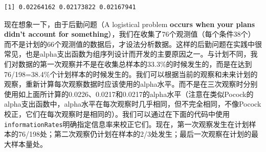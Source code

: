 \documentclass[
  letterpaper,
  DIV=11,
  numbers=noendperiod]{scrreprt}
\newenvironment{Shaded}{\begin{snugshade}}{\end{snugshade}}
\newcommand{\AttributeTok}[1]{\textcolor[rgb]{0.40,0.45,0.13}{#1}}
\newcommand{\DecValTok}[1]{\textcolor[rgb]{0.68,0.00,0.00}{#1}}
\newcommand{\FloatTok}[1]{\textcolor[rgb]{0.68,0.00,0.00}{#1}}
\newcommand{\FunctionTok}[1]{\textcolor[rgb]{0.28,0.35,0.67}{#1}}
\newcommand{\NormalTok}[1]{\textcolor[rgb]{0.00,0.23,0.31}{#1}}
\newcommand{\OtherTok}[1]{\textcolor[rgb]{0.00,0.23,0.31}{#1}}
\newcommand{\SpecialCharTok}[1]{\textcolor[rgb]{0.37,0.37,0.37}{#1}}
\newcommand{\StringTok}[1]{\textcolor[rgb]{0.13,0.47,0.30}{#1}}
\begin{document}
\begin{Shaded}
\end{Shaded}

\begin{verbatim}
[1] 0.02264162 0.02173822 0.02167941
\end{verbatim}

现在想象一下，由于后勤问题（A logistical problem \textbf{occurs when
your plans didn't account for
something}），我们在收集了76个观测值（每个条件38个）而不是计划的66个观测值的数据后，才设法分析数据。这样的后勤问题在实践中很常见，也是alpha支出函数为组序列设计而开发的主要原因之一。与计划不同，我们对数据的第一次观察并不是在收集总样本的33.3\%的时候发生的，而是在达到76/198=38.4\%个计划样本的时候发生的。我们可以根据当前的观察和未来计划的观察，重新计算每次观察数据时应该使用的alpha水平。而不是在三次观察时分别使用如上面所计算的0.0226、0.0217和0.0217的alpha水平（注意在类似Pocock的alpha支出函数中，alpha水平在每次观察时几乎相同，但不完全相同，不像Pocock校正，它们在每次观察时是相同的）。我们可以通过在下面的代码中使用\texttt{informationRates}明确指定信息率来校正它们。现在，第一次观察发生在计划样本的76/198处；第二次观察仍计划在样本的2/3处发生；最后一次观察在计划的最大样本量处。

\begin{Shaded}
\end{Shaded}
\end{document}
